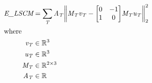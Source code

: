 \documentclass[12pt]{article}
\let\originalleft\left
\let\originalright\right
\renewcommand{\left}{\mathopen{}\mathclose\bgroup\originalleft}
\renewcommand{\right}{\aftergroup\egroup\originalright}
\begin{document}
\begin{center}
\resizebox{\textwidth}{!} 
{
\begin{minipage}[c]{\textwidth}
\begin{align*}
\textit{E\_LSCM} & = \sum_\mathit{T} \mathit{A}_{ \mathit{T} }\left\|\mathit{M}_{ \mathit{T} }\mathit{v}_{ \mathit{T} } - \begin{bmatrix}
0 & -1\\
1 & 0\\
\end{bmatrix}\mathit{M}_{ \mathit{T} }\mathit{u}_{ \mathit{T} }\right\|_2^{2} \\
\intertext{where} 
\mathit{v}_{\mathit{T}} & \in \mathbb{R}^{ 3} \\
\mathit{u}_{\mathit{T}} & \in \mathbb{R}^{ 3} \\
\mathit{M}_{\mathit{T}} & \in \mathbb{R}^{ 2 \times 3 } \\
\mathit{A}_{\mathit{T}} & \in \mathbb{R} \\
\\
\end{align*}
\end{minipage}
}
\end{center}
\end{document}
